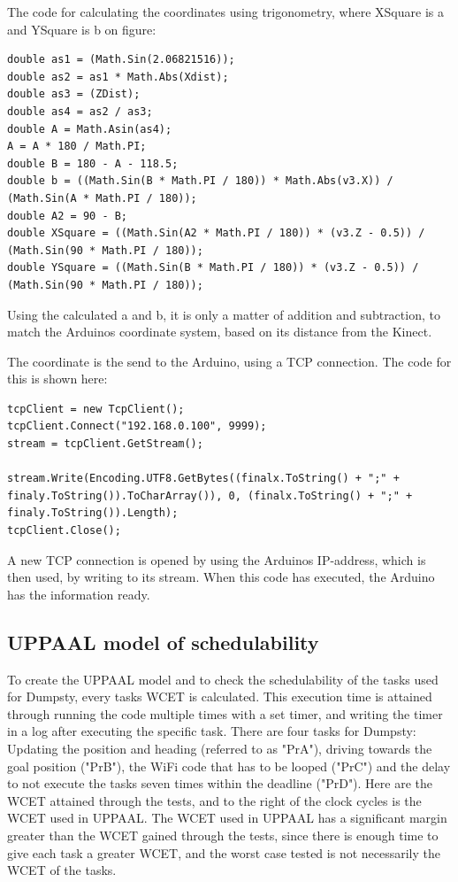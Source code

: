 The code for calculating the coordinates using trigonometry, where XSquare is a and YSquare is b on figure:

\begin{lstlisting}[caption={Converting coordinates form Kinect}, label={convertCoordinate}]
double as1 = (Math.Sin(2.06821516));
double as2 = as1 * Math.Abs(Xdist);
double as3 = (ZDist);
double as4 = as2 / as3;
double A = Math.Asin(as4);
A = A * 180 / Math.PI;
double B = 180 - A - 118.5;
double b = ((Math.Sin(B * Math.PI / 180)) * Math.Abs(v3.X)) / (Math.Sin(A * Math.PI / 180));
double A2 = 90 - B;
double XSquare = ((Math.Sin(A2 * Math.PI / 180)) * (v3.Z - 0.5)) / (Math.Sin(90 * Math.PI / 180));
double YSquare = ((Math.Sin(B * Math.PI / 180)) * (v3.Z - 0.5)) / (Math.Sin(90 * Math.PI / 180));
\end{lstlisting}

Using the calculated a and b, it is only a matter of addition and subtraction, to match the Arduinos coordinate system, based on its distance from the Kinect.

The coordinate is the send to the Arduino, using a TCP connection.
The code for this is shown here:
\begin{lstlisting}[caption={Sending data to the Arduino}, label={sendData}]
tcpClient = new TcpClient();
tcpClient.Connect("192.168.0.100", 9999);
stream = tcpClient.GetStream();

stream.Write(Encoding.UTF8.GetBytes((finalx.ToString() + ";" + finaly.ToString()).ToCharArray()), 0, (finalx.ToString() + ";" + finaly.ToString()).Length);
tcpClient.Close();
\end{lstlisting}

A new TCP connection is opened by using the Arduinos IP-address, which is then used, by writing to its stream.
When this code has executed, the Arduino has the information ready.

\subsection{UPPAAL model of schedulability}
\label{sec:i3UPPAAL model}
To create the UPPAAL model and to check the schedulability of the tasks used for Dumpsty, every tasks WCET is calculated. This execution time is attained through running the code multiple times with a set timer, and writing the timer in a log after executing the specific task. There are four tasks for Dumpsty: Updating the position and heading (referred to as "PrA"), driving towards the goal position ("PrB"), the WiFi code that has to be looped ("PrC") and the delay to not execute the tasks seven times within the deadline ("PrD"). Here are the WCET attained through the tests, and to the right of the clock cycles is the WCET used in UPPAAL. The WCET used in UPPAAL has a significant margin greater than the WCET gained through the tests, since there is enough time to give each task a greater WCET, and the worst case tested is not necessarily the WCET of the tasks. 

